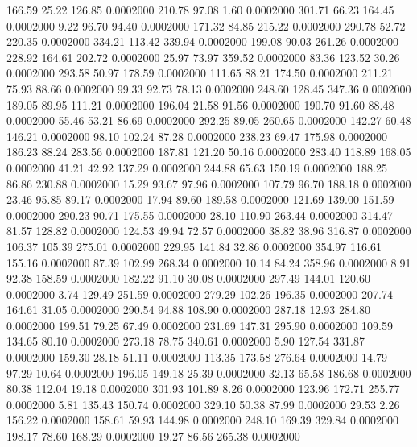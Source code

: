 166.59   25.22  126.85   0.0002000
 210.78   97.08    1.60   0.0002000
 301.71   66.23  164.45   0.0002000
   9.22   96.70   94.40   0.0002000
 171.32   84.85  215.22   0.0002000
 290.78   52.72  220.35   0.0002000
 334.21  113.42  339.94   0.0002000
 199.08   90.03  261.26   0.0002000
 228.92  164.61  202.72   0.0002000
  25.97   73.97  359.52   0.0002000
  83.36  123.52   30.26   0.0002000
 293.58   50.97  178.59   0.0002000
 111.65   88.21  174.50   0.0002000
 211.21   75.93   88.66   0.0002000
  99.33   92.73   78.13   0.0002000
 248.60  128.45  347.36   0.0002000
 189.05   89.95  111.21   0.0002000
 196.04   21.58   91.56   0.0002000
 190.70   91.60   88.48   0.0002000
  55.46   53.21   86.69   0.0002000
 292.25   89.05  260.65   0.0002000
 142.27   60.48  146.21   0.0002000
  98.10  102.24   87.28   0.0002000
 238.23   69.47  175.98   0.0002000
 186.23   88.24  283.56   0.0002000
 187.81  121.20   50.16   0.0002000
 283.40  118.89  168.05   0.0002000
  41.21   42.92  137.29   0.0002000
 244.88   65.63  150.19   0.0002000
 188.25   86.86  230.88   0.0002000
  15.29   93.67   97.96   0.0002000
 107.79   96.70  188.18   0.0002000
  23.46   95.85   89.17   0.0002000
  17.94   89.60  189.58   0.0002000
 121.69  139.00  151.59   0.0002000
 290.23   90.71  175.55   0.0002000
  28.10  110.90  263.44   0.0002000
 314.47   81.57  128.82   0.0002000
 124.53   49.94   72.57   0.0002000
  38.82   38.96  316.87   0.0002000
 106.37  105.39  275.01   0.0002000
 229.95  141.84   32.86   0.0002000
 354.97  116.61  155.16   0.0002000
  87.39  102.99  268.34   0.0002000
  10.14   84.24  358.96   0.0002000
   8.91   92.38  158.59   0.0002000
 182.22   91.10   30.08   0.0002000
 297.49  144.01  120.60   0.0002000
   3.74  129.49  251.59   0.0002000
 279.29  102.26  196.35   0.0002000
 207.74  164.61   31.05   0.0002000
 290.54   94.88  108.90   0.0002000
 287.18   12.93  284.80   0.0002000
 199.51   79.25   67.49   0.0002000
 231.69  147.31  295.90   0.0002000
 109.59  134.65   80.10   0.0002000
 273.18   78.75  340.61   0.0002000
   5.90  127.54  331.87   0.0002000
 159.30   28.18   51.11   0.0002000
 113.35  173.58  276.64   0.0002000
  14.79   97.29   10.64   0.0002000
 196.05  149.18   25.39   0.0002000
  32.13   65.58  186.68   0.0002000
  80.38  112.04   19.18   0.0002000
 301.93  101.89    8.26   0.0002000
 123.96  172.71  255.77   0.0002000
   5.81  135.43  150.74   0.0002000
 329.10   50.38   87.99   0.0002000
  29.53    2.26  156.22   0.0002000
 158.61   59.93  144.98   0.0002000
 248.10  169.39  329.84   0.0002000
 198.17   78.60  168.29   0.0002000
  19.27   86.56  265.38   0.0002000
